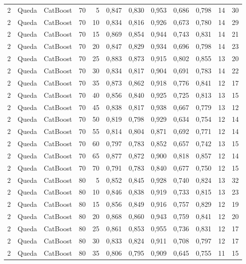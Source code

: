 \begin{longtable}{ccclrrrrrrrr}
2 & Queda & CatBoost & 70 & 5 & 0,847 & 0,830 & 0,953 & 0,686 & 0,798 & 14 & 30 \\
2 & Queda & CatBoost & 70 & 10 & 0,834 & 0,816 & 0,926 & 0,673 & 0,780 & 14 & 29 \\
2 & Queda & CatBoost & 70 & 15 & 0,869 & 0,854 & 0,944 & 0,743 & 0,831 & 14 & 21 \\
2 & Queda & CatBoost & 70 & 20 & 0,847 & 0,829 & 0,934 & 0,696 & 0,798 & 14 & 23 \\
2 & Queda & CatBoost & 70 & 25 & 0,883 & 0,873 & 0,915 & 0,802 & 0,855 & 13 & 20 \\
2 & Queda & CatBoost & 70 & 30 & 0,834 & 0,817 & 0,904 & 0,691 & 0,783 & 14 & 22 \\
2 & Queda & CatBoost & 70 & 35 & 0,873 & 0,862 & 0,918 & 0,776 & 0,841 & 12 & 17 \\
2 & Queda & CatBoost & 70 & 40 & 0,856 & 0,840 & 0,925 & 0,725 & 0,813 & 13 & 15 \\
2 & Queda & CatBoost & 70 & 45 & 0,838 & 0,817 & 0,938 & 0,667 & 0,779 & 13 & 12 \\
2 & Queda & CatBoost & 70 & 50 & 0,819 & 0,798 & 0,929 & 0,634 & 0,754 & 12 & 14 \\
2 & Queda & CatBoost & 70 & 55 & 0,814 & 0,804 & 0,871 & 0,692 & 0,771 & 12 & 14 \\
2 & Queda & CatBoost & 70 & 60 & 0,797 & 0,783 & 0,852 & 0,657 & 0,742 & 13 & 15 \\
2 & Queda & CatBoost & 70 & 65 & 0,877 & 0,872 & 0,900 & 0,818 & 0,857 & 12 & 14 \\
2 & Queda & CatBoost & 70 & 70 & 0,791 & 0,783 & 0,840 & 0,677 & 0,750 & 12 & 15 \\
2 & Queda & CatBoost & 80 & 5 & 0,852 & 0,845 & 0,928 & 0,740 & 0,824 & 13 & 32 \\
2 & Queda & CatBoost & 80 & 10 & 0,846 & 0,838 & 0,919 & 0,733 & 0,815 & 13 & 23 \\
2 & Queda & CatBoost & 80 & 15 & 0,856 & 0,849 & 0,916 & 0,757 & 0,829 & 12 & 19 \\
2 & Queda & CatBoost & 80 & 20 & 0,868 & 0,860 & 0,943 & 0,759 & 0,841 & 12 & 20 \\
2 & Queda & CatBoost & 80 & 25 & 0,861 & 0,853 & 0,955 & 0,736 & 0,831 & 12 & 17 \\
2 & Queda & CatBoost & 80 & 30 & 0,833 & 0,824 & 0,911 & 0,708 & 0,797 & 12 & 17 \\
2 & Queda & CatBoost & 80 & 35 & 0,806 & 0,795 & 0,909 & 0,645 & 0,755 & 11 & 15 \\

\end{longtable}
